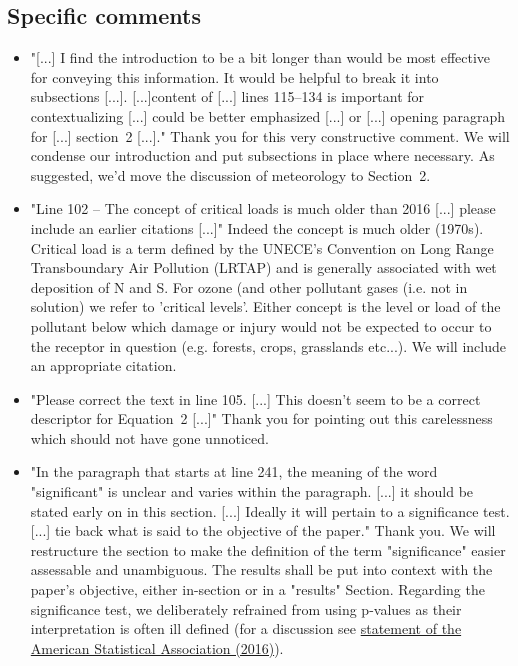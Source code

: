\documentclass{scrartcl}
\begin{document}
\subsection*{Specific comments}
\begin{itemize}
    
    \item {\color{blue} "[...] I find the introduction to be a bit longer than would be most effective for conveying this information. It would be helpful to break it into subsections [...]. [...]content of [...] lines 115--134 is important for contextualizing [...] could be better emphasized [...] or [...] opening paragraph for [...] section~2 [...]."} Thank you for this very constructive comment. We will condense our introduction and put subsections in place where necessary. As suggested, we'd move the discussion of meteorology to Section~2.
    \item {\color{blue}"Line 102 -- The concept of critical loads is much older than 2016 [...] please include an earlier citations [...]"} Indeed the concept is much older (1970s). Critical load is a term defined by the UNECE's Convention on Long Range Transboundary Air Pollution (LRTAP) and is generally associated with wet deposition of N and S. For ozone (and other pollutant gases (i.e. not in solution) we refer to 'critical levels'. Either concept is the level or load of the pollutant below which damage or injury would not be expected to occur to the receptor in question (e.g. forests, crops, grasslands etc...). We will include an appropriate citation.   
    \item {\color{blue} "Please correct the text in line 105. [...] This doesn't seem to be a correct descriptor for Equation~2 [...]"} Thank you for pointing out this carelessness which should not have gone unnoticed.
    \item {\color{blue} "In the paragraph that starts at line 241, the meaning of the word "significant" is unclear and varies within the paragraph. [...] it should be stated early on in this section. [...] Ideally it will pertain to a
    significance test. [...] tie back what is said to the objective of the paper."} Thank you. We will restructure the section to make the definition of the term "significance" easier assessable and unambiguous. The results shall be put into context with the paper's objective, either in-section or in a "results" Section. Regarding the significance test, we deliberately refrained from using p-values as their interpretation is often ill defined (for a discussion see \href{https://doi.org/10.1080/00031305.2016.1154108}{statement of the American Statistical Association (2016)}).

\end{itemize}
\end{document}
